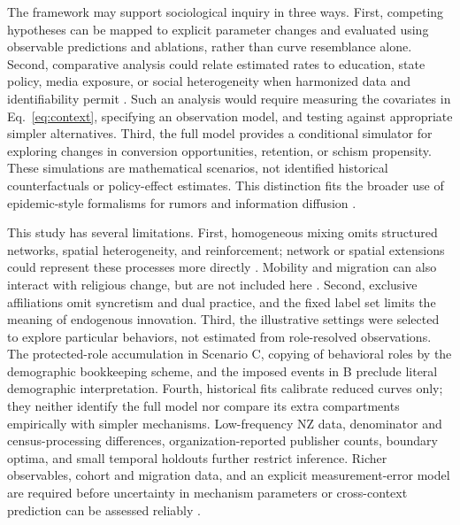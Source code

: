 The framework may support sociological inquiry in three ways. First, competing hypotheses can be mapped to explicit parameter changes and evaluated using observable predictions and ablations, rather than curve resemblance alone. Second, comparative analysis could relate estimated rates to education, state policy, media exposure, or social heterogeneity when harmonized data and identifiability permit \cite{rogers2003diffusion,norrisInglehart2012sacred}. Such an analysis would require measuring the covariates in Eq.~\eqref{eq:context}, specifying an observation model, and testing against appropriate simpler alternatives. Third, the full model provides a conditional simulator for exploring changes in conversion opportunities, retention, or schism propensity. These simulations are mathematical scenarios, not identified historical counterfactuals or policy-effect estimates. This distinction fits the broader use of epidemic-style formalisms for rumors and information diffusion \cite{daleyKendall1965rumours,kabir2019analysis,zhao2013sir,rui2018spir,matsumoto2025information}.

This study has several limitations. First, homogeneous mixing omits structured networks, spatial heterogeneity, and reinforcement; network or spatial extensions could represent these processes more directly \cite{centolaMacy2007complex,zheng2023spatiotemporal,mahmood2022modeling}. Mobility and migration can also interact with religious change, but are not included here \cite{intro_21,ng2022muslim}. Second, exclusive affiliations omit syncretism and dual practice, and the fixed label set limits the meaning of endogenous innovation. Third, the illustrative settings were selected to explore particular behaviors, not estimated from role-resolved observations. The protected-role accumulation in Scenario C, copying of behavioral roles by the demographic bookkeeping scheme, and the imposed events in B preclude literal demographic interpretation. Fourth, historical fits calibrate reduced curves only; they neither identify the full model nor compare its extra compartments empirically with simpler mechanisms. Low-frequency NZ data, denominator and census-processing differences, organization-reported publisher counts, boundary optima, and small temporal holdouts further restrict inference. Richer observables, cohort and migration data, and an explicit measurement-error model are required before uncertainty in mechanism parameters or cross-context prediction can be assessed reliably \cite{cavalliSforzaFeldman1981cultural,norrisInglehart2012sacred}.

